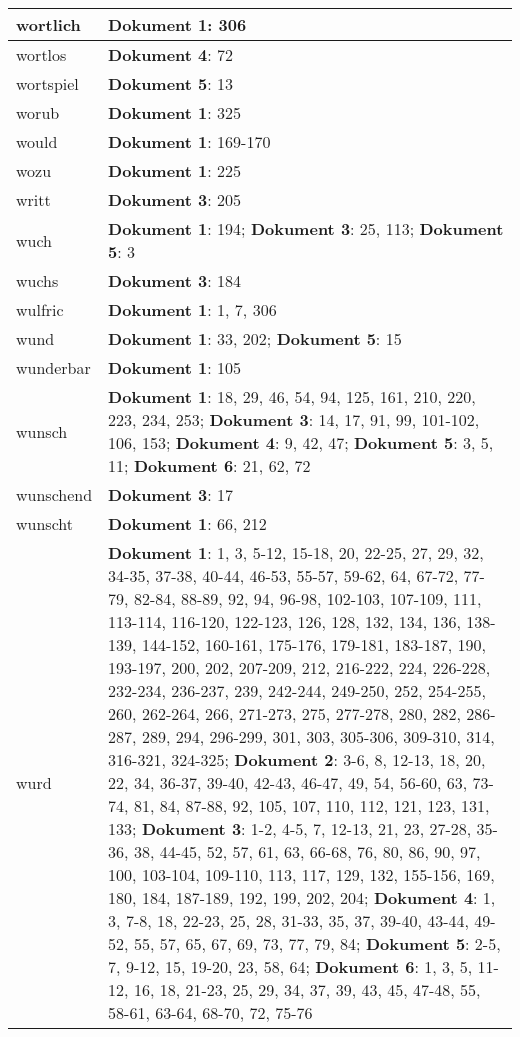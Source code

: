 \documentclass[a5paper]{article}
\begin{document}
\begin{longtable}[l]{|l|p{3in}|}
\hline
wortlich & \textbf{Dokument 1}: 306 \\
\hline
wortlos & \textbf{Dokument 4}: 72 \\
\hline
wortspiel & \textbf{Dokument 5}: 13 \\
\hline
worub & \textbf{Dokument 1}: 325 \\
\hline
would & \textbf{Dokument 1}: 169-170 \\
\hline
wozu & \textbf{Dokument 1}: 225 \\
\hline
writt & \textbf{Dokument 3}: 205 \\
\hline
wuch & \textbf{Dokument 1}: 194; \textbf{Dokument 3}: 25, 113; \textbf{Dokument 5}: 3 \\
\hline
wuchs & \textbf{Dokument 3}: 184 \\
\hline
wulfric & \textbf{Dokument 1}: 1, 7, 306 \\
\hline
wund & \textbf{Dokument 1}: 33, 202; \textbf{Dokument 5}: 15 \\
\hline
wunderbar & \textbf{Dokument 1}: 105 \\
\hline
wunsch & \textbf{Dokument 1}: 18, 29, 46, 54, 94, 125, 161, 210, 220, 223, 234, 253; \textbf{Dokument 3}: 14, 17, 91, 99, 101-102, 106, 153; \textbf{Dokument 4}: 9, 42, 47; \textbf{Dokument 5}: 3, 5, 11; \textbf{Dokument 6}: 21, 62, 72 \\
\hline
wunschend & \textbf{Dokument 3}: 17 \\
\hline
wunscht & \textbf{Dokument 1}: 66, 212 \\
\hline
wurd & \textbf{Dokument 1}: 1, 3, 5-12, 15-18, 20, 22-25, 27, 29, 32, 34-35, 37-38, 40-44, 46-53, 55-57, 59-62, 64, 67-72, 77-79, 82-84, 88-89, 92, 94, 96-98, 102-103, 107-109, 111, 113-114, 116-120, 122-123, 126, 128, 132, 134, 136, 138-139, 144-152, 160-161, 175-176, 179-181, 183-187, 190, 193-197, 200, 202, 207-209, 212, 216-222, 224, 226-228, 232-234, 236-237, 239, 242-244, 249-250, 252, 254-255, 260, 262-264, 266, 271-273, 275, 277-278, 280, 282, 286-287, 289, 294, 296-299, 301, 303, 305-306, 309-310, 314, 316-321, 324-325; \textbf{Dokument 2}: 3-6, 8, 12-13, 18, 20, 22, 34, 36-37, 39-40, 42-43, 46-47, 49, 54, 56-60, 63, 73-74, 81, 84, 87-88, 92, 105, 107, 110, 112, 121, 123, 131, 133; \textbf{Dokument 3}: 1-2, 4-5, 7, 12-13, 21, 23, 27-28, 35-36, 38, 44-45, 52, 57, 61, 63, 66-68, 76, 80, 86, 90, 97, 100, 103-104, 109-110, 113, 117, 129, 132, 155-156, 169, 180, 184, 187-189, 192, 199, 202, 204; \textbf{Dokument 4}: 1, 3, 7-8, 18, 22-23, 25, 28, 31-33, 35, 37, 39-40, 43-44, 49-52, 55, 57, 65, 67, 69, 73, 77, 79, 84; \textbf{Dokument 5}: 2-5, 7, 9-12, 15, 19-20, 23, 58, 64; \textbf{Dokument 6}: 1, 3, 5, 11-12, 16, 18, 21-23, 25, 29, 34, 37, 39, 43, 45, 47-48, 55, 58-61, 63-64, 68-70, 72, 75-76 \\

\end{longtable}
\end{document}

